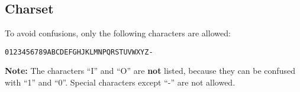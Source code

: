 %
%
%
%
%
%
%

\subsection{Charset}

To avoid confusions, only the following characters are allowed:

\begin{verbatim}
0123456789ABCDEFGHJKLMNPQRSTUVWXYZ-
\end{verbatim}

\textbf{Note:} The characters ``I'' and ``O'' are \textbf{not} listed, because
they can be confused with ``1'' and ``0''. Special characters except ``-'' are
not allowed.
